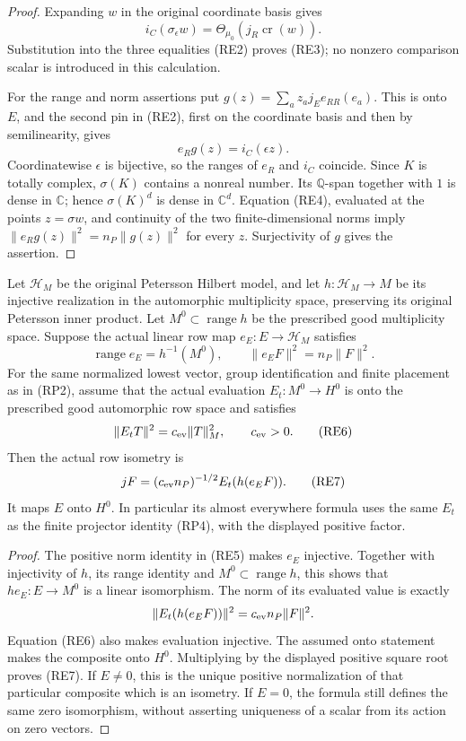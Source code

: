 \begin{proof}
Expanding \(w\) in the original coordinate basis gives
\[
 i_C(\sigma_\epsilon w)
       =\Theta_{\mu_0}(j_R\operatorname{cr}(w)).
\]
Substitution into the three equalities (RE2) proves (RE3);
no nonzero comparison scalar is introduced in this calculation.

For the range and norm assertions put
\(g(z)=\sum_a z_a j_Ee_{RR}(e_a)\).
This is onto \(E\), and the second pin in (RE2), first on
the coordinate basis and then by semilinearity, gives
\[
            e_Rg(z)=i_C(\epsilon z).
\]
Coordinatewise \(\epsilon\) is bijective, so the ranges of
\(e_R\) and \(i_C\) coincide.  Since \(K\) is totally
complex, \(\sigma(K)\) contains a nonreal number.  Its
\(\mathbb Q\)-span together with \(1\) is dense in
\(\mathbb C\); hence \(\sigma(K)^d\) is dense in
\(\mathbb C^d\).  Equation (RE4), evaluated at the points
\(z=\sigma w\), and continuity of the two finite-dimensional
norms imply \(\|e_Rg(z)\|^2=n_P\|g(z)\|^2\) for every
\(z\).  Surjectivity of \(g\) gives the assertion.
\end{proof}

\begin{lemma}
\label{lem:retained-evaluation-normalization}
Let \(\mathcal H_M\) be the original Petersson Hilbert model,
and let \(h:\mathcal H_M\to M\) be its injective realization
in the automorphic multiplicity space, preserving its original
Petersson inner product.  Let \(M^0\subset\operatorname{range}h\)
be the prescribed good multiplicity space.  Suppose the actual
linear row map \(e_E:E\to\mathcal H_M\) satisfies
\[
 \operatorname{range}e_E=h^{-1}(M^0),\qquad
 \|e_EF\|^2=n_P\|F\|^2.                               \tag{RE5}
\]
For the same normalized lowest vector, group identification and
finite placement as in (RP2), assume that the actual evaluation
\(E_t:M^0\to H^0\) is onto the prescribed good automorphic
row space and satisfies
\[
 \|E_tT\|^2=c_{\rm ev}\|T\|_M^2,\qquad c_{\rm ev}>0.
                                                        \tag{RE6}
\]
Then the actual row isometry is
\[
 jF=(c_{\rm ev}n_P)^{-1/2}E_t(h(e_EF)).                 \tag{RE7}
\]
It maps \(E\) onto \(H^0\).  In particular its almost
everywhere formula uses the same \(E_t\) as the finite projector
identity (RP4), with the displayed positive factor.
\end{lemma}

\begin{proof}
The positive norm identity in (RE5) makes \(e_E\) injective.
Together with injectivity of \(h\), its range identity and
\(M^0\subset\operatorname{range}h\), this shows that
\(h e_E:E\to M^0\) is a linear isomorphism.
The norm of its evaluated value is exactly
\[
 \|E_t(h(e_EF))\|^2=c_{\rm ev}n_P\|F\|^2.
\]
Equation (RE6) also makes evaluation injective.  The assumed
onto statement makes the composite onto \(H^0\).  Multiplying
by the displayed positive square root proves (RE7).
If \(E\ne0\), this is the unique positive normalization of
that particular composite which is an isometry.  If \(E=0\),
the formula still defines the same zero isomorphism, without
asserting uniqueness of a scalar from its action on zero vectors.
\end{proof}

